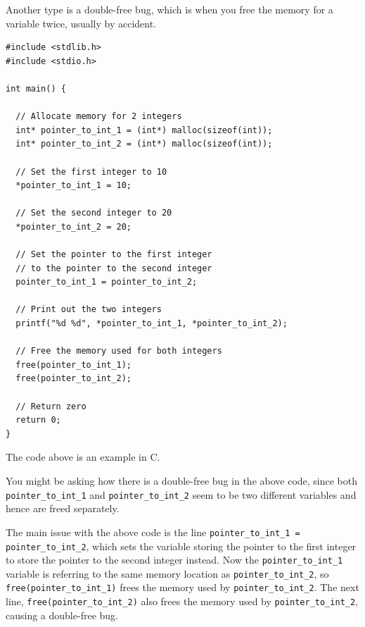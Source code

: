 \documentclass[11pt]{article}
\begin{document}
 \newpage

Another type is a double-free bug, which is when you
free the memory for a variable twice, usually by accident.  \\

\begin{listing}[htbp]
\begin{verbatim}
#include <stdlib.h>
#include <stdio.h>

int main() {

  // Allocate memory for 2 integers
  int* pointer_to_int_1 = (int*) malloc(sizeof(int));
  int* pointer_to_int_2 = (int*) malloc(sizeof(int));

  // Set the first integer to 10
  *pointer_to_int_1 = 10;

  // Set the second integer to 20
  *pointer_to_int_2 = 20;

  // Set the pointer to the first integer
  // to the pointer to the second integer
  pointer_to_int_1 = pointer_to_int_2;

  // Print out the two integers
  printf("%d %d", *pointer_to_int_1, *pointer_to_int_2);

  // Free the memory used for both integers
  free(pointer_to_int_1);
  free(pointer_to_int_2);

  // Return zero
  return 0;
}
\end{verbatim}
\caption{The code above is an example in C.}
\end{listing}
\label{org3c03684}

You might be asking how there is a double-free bug in the above code,
since both \texttt{pointer\_to\_int\_1} and \texttt{pointer\_to\_int\_2} seem to be two
different variables and hence are freed separately.

 \newpage

The main issue with the above code is the line
\texttt{pointer\_to\_int\_1 = pointer\_to\_int\_2}, which sets
the variable storing the pointer to the first integer
to store the pointer to the second integer instead.
Now the \texttt{pointer\_to\_int\_1} variable is referring
to the same memory location as \texttt{pointer\_to\_int\_2},
so \texttt{free(pointer\_to\_int\_1)} frees the memory used
by \texttt{pointer\_to\_int\_2}. The next line,
\texttt{free(pointer\_to\_int\_2)} also
frees the memory used by \texttt{pointer\_to\_int\_2},
causing a double-free bug.
\end{document}
